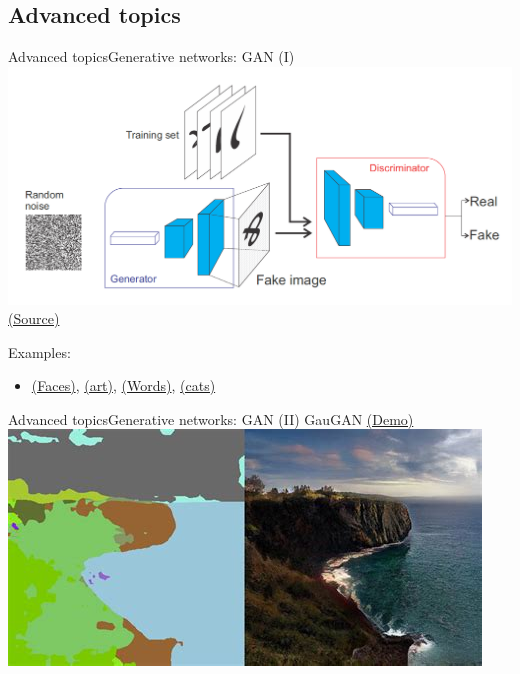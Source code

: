 \documentclass[10pt,compress]{beamer} %
\begin{document}
\subsection{Advanced topics}
\begin{frame}{Advanced topics}{Generative networks: GAN (I)}
	\centering\includegraphics[width=0.7\linewidth]{figs/gan.png}\\
	\scriptsize\href{https://www.oreilly.com/library/view/java-deep-learning/9781788997454/60579068-af4b-4bbf-83f1-e988fbe3b226.xhtml}{(Source)}\\

    \normalsize
    \begin{flushleft}
   Examples:\\
    \begin{itemize}
        \item \href{https://thispersondoesnotexist.com/}{(Faces)}, \href{https://thisartworkdoesnotexist.com/}{(art)}, \href{http://www.thisworddoesnotexist.com/}{(Words)}, \href{https://thesecatsdonotexist.com/}{(cats)}
    \end{itemize}
    \end{flushleft}
\end{frame}

\begin{frame}{Advanced topics}{Generative networks: GAN (II)}
    \centering GauGAN \href{https://www.nvidia.com/en-us/studio/canvas/}{(Demo)}\\
	\includegraphics[width=0.9\linewidth]{figs/gaugan.jpeg}
\end{frame}
\end{document}
